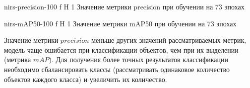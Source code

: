 {nirs-precision-100} %
{f} %
{H} %
{1\textwidth} %
{Значение метрики precision при обучении на 73 эпохах} %


{nirs-mAP50-100} %
{f} %
{H} %
{1\textwidth} %
{Значение метрики mAP50 при обучении на 73 эпохах} %

Значение метрики $precision$  меньше других значений рассматриваемых метрик, модель чаще ошибается при классификации объектов, чем при их выделении (метрика $mAP$).
Для получения более точных результатов  классификации необходимо сбалансировать классы (рассматривать  одинаковое количество объектов каждого класса) и
увеличить их количество.




